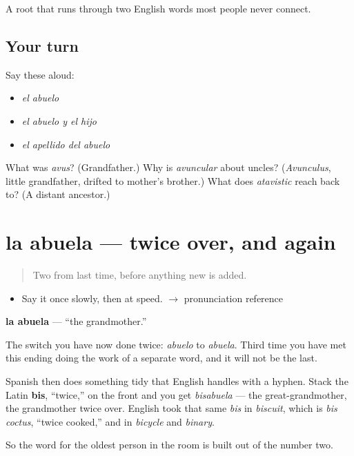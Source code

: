 \begin{grammarlens}[title={What you've built}]
A root that runs through two English words most people never connect.
\end{grammarlens}

\subsection*{Your turn}
Say these aloud:

\begin{itemize}
\raggedright
  \item \emph{el abuelo}
  \item \emph{el abuelo y el hijo}
  \item \emph{el apellido del abuelo}
\end{itemize}

\begin{tcolorbox}[breakable,colback=teal!4,colframe=teal!35!black,title={Before you move on}]
What was \emph{avus}? (Grandfather.) Why is \emph{avuncular} about uncles? (\emph{Avunculus}, little grandfather, drifted to mother's brother.) What does \emph{atavistic} reach back to? (A distant ancestor.)
\end{tcolorbox}
\section[la abuela]{la abuela --- twice over, and again}

\label{lesson:ES-C306-abuela}



\begin{quote}
Two from last time, before anything new is added.
\end{quote}

\begin{sounds}
\begin{itemize}
\raggedright
  \item Say it once slowly, then at speed. $\to$ pronunciation reference
\end{itemize}
\end{sounds}

\begin{cousinweb}
\textbf{la abuela} --- \textquotedblleft{}the grandmother.\textquotedblright{}

The switch you have now done twice: \emph{abuelo} to \emph{abuela}. Third time you have met this ending doing the work of a separate word, and it will not be the last.

Spanish then does something tidy that English handles with a hyphen. Stack the Latin \textbf{bis}, \textquotedblleft{}twice,\textquotedblright{} on the front and you get \emph{bisabuela} --- the great-grandmother, the grandmother twice over. English took that same \emph{bis} in \emph{biscuit}, which is \emph{bis coctus}, \textquotedblleft{}twice cooked,\textquotedblright{} and in \emph{bicycle} and \emph{binary}.

So the word for the oldest person in the room is built out of the number two.
\end{cousinweb}

